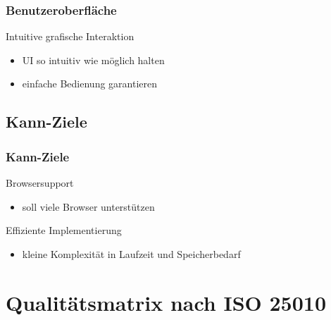 \documentclass{beamer}
\begin{document}
\begin{frame}
\frametitle{Benutzeroberfläche}

\begin{block}{Intuitive grafische Interaktion}
\begin{itemize}
\item UI so intuitiv wie möglich halten
\item einfache Bedienung garantieren
\end{itemize}
\end{block}

\end{frame}

\subsection{Kann-Ziele}

\begin{frame}
\frametitle{Kann-Ziele}

\begin{block}{Browsersupport}
\begin{itemize}
\item soll viele Browser unterstützen
\end{itemize}
\end{block}

\begin{block}{Effiziente Implementierung}
\begin{itemize}
\item kleine Komplexität in Laufzeit und Speicherbedarf
\end{itemize}
\end{block}

\end{frame}

\section{Qualitätsmatrix nach ISO 25010}

\end{document}
